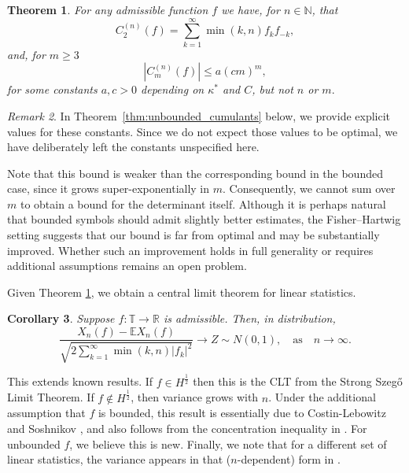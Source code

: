 \documentclass[11pt]{amsart}
\theoremstyle{plain}
\newtheorem{theorem}{Theorem}[section]
\newtheorem{corollary}[theorem]{Corollary}
\theoremstyle{remark}
\newtheorem{remark}[theorem]{Remark}
\numberwithin{equation}{section}
\begin{document}
\begin{theorem}\label{thm:unbounded_cumulants_intro}
For any admissible function $f$ we have, for $n \in \mathbb N$, that
 \begin{equation}
        C_2^{(n)}(f)= \sum_{k=1}^\infty \min (k,n) f_kf_{-k},
    \end{equation}
    and, for $m\geq 3$
    \begin{equation}
        \left|C_m^{(n)}(f)\right|\leq a (cm)^m,
    \end{equation}
    for some constants $a,c>0$ depending on $\kappa^*$ and $C$, but not $n$ or $m.$
\end{theorem}
\begin{remark}
   In Theorem~\ref{thm:unbounded_cumulants} below, we provide explicit values for these constants. Since we do not expect those values to be optimal, we have deliberately left the constants unspecified here.
\end{remark}
Note that this bound is weaker  than the corresponding bound in the bounded case, since it grows super-exponentially in $m$. Consequently, we cannot sum over $m$ to obtain a bound for the determinant itself. Although it is perhaps natural that bounded symbols should admit slightly better estimates, the Fisher--Hartwig setting suggests that our bound is far from optimal and may be substantially improved. Whether such an improvement holds in full generality or requires additional assumptions remains an open problem.

Given Theorem \ref{thm:unbounded_cumulants_intro}, we obtain a central limit theorem for linear statistics.

\begin{corollary}
Suppose $f:\mathbb{T}\rightarrow \mathbb{R}$ is admissible. Then, in distribution,
\begin{equation} 
    \frac{X_n(f)-\mathbb E X_n(f)}{\sqrt{2\sum_{k=1}^\infty \min(k,n) |f_k|^2}} 
    \to Z \sim N\left(0,1\right),\quad\text{as}\quad n\rightarrow\infty.
\end{equation}
\end{corollary}
This extends known results. If $f\in H^{\frac12}$  then this is the CLT from the Strong Szeg\H{o} Limit Theorem. If $f \notin H^{\frac 12}$, then variance grows with $n$. Under the additional assumption that $f$ is bounded, this result is essentially due to Costin-Lebowitz \cite{CL} and Soshnikov \cite{Sosh}, and also follows from the concentration inequality in \cite{BreuerDuits}. For unbounded $f$, we believe this is new. Finally, we note that for a different set of linear statistics, the variance appears in that ($n$-dependent) form in \cite{DuiJoh}. 
\end{document}
